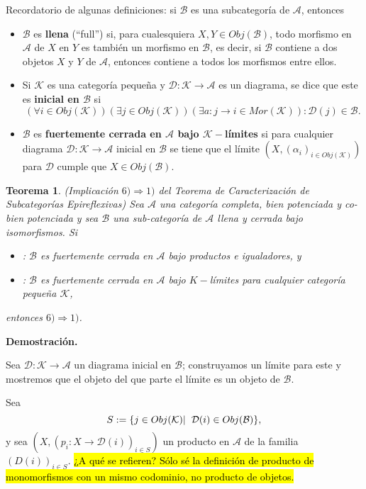 \documentclass[10pt]{article}
\newtheorem{teo}{Teorema}[section]
\begin{document}
Recordatorio de algunas definiciones: si $\mathcal{B}$ es una
subcategoría de $\mathcal{A}$, entonces
\begin{itemize}
	\item $\mathcal{B}$ es \textbf{llena} (``full'') si, para cualesquiera
	$X, Y \in Obj(\mathcal{B})$, todo morfismo en 
	$\mathcal{A}$ de $X$ en $Y$ es también un morfismo en 
	$\mathcal{B}$, es decir, si $\mathcal{B}$ contiene a dos objetos
	$X$ y $Y$ de $\mathcal{A}$, entonces contiene a todos los morfismos
	entre ellos.
	\item Si $\mathcal{K}$ es una categoría pequeña y 
	$\mathcal{D}: \mathcal{K} \longrightarrow \mathcal{A}$ es un diagrama,
	se dice que este es \textbf{inicial en $\mathcal{B}$} si
	\[
	(\forall i \in Obj(\mathcal{K}))
	(\exists j \in Obj(\mathcal{K}))
	(\exists a: j \longrightarrow i \in Mor(\mathcal{K})):
	\mathcal{D}(j) \in \mathcal{B}.
	\]
	\item $\mathcal{B}$ es \textbf{fuertemente cerrada en 
	$\mathcal{A}$ bajo $\mathcal{K}-$límites} si 
	para cualquier diagrama 
	$\mathcal{D}: \mathcal{K} \longrightarrow \mathcal{A}$	
	inicial en $\mathcal{B}$ se tiene que el límite 
	$(X, (\alpha_{i})_{i \in Obj(\mathcal{K})})$ para 
	$\mathcal{D}$ cumple que $X \in Obj(\mathcal{B})$.
\end{itemize}

\begin{teo}
(Implicación $6) \Rightarrow 1)$ del Teorema de Caracterización de
Subcategorías Epireflexivas) Sea $\mathcal{A}$ una categoría 
completa, bien potenciada y co-bien potenciada y sea 
$\mathcal{B}$ una sub-categoría de $\mathcal{A}$
llena y cerrada bajo isomorfismos. Si
\begin{itemize}
	\item[$6)$]: $\mathcal{B}$ es fuertemente cerrada en 
	$\mathcal{A}$ bajo productos e igualadores, y
	\item[$1)$]: $\mathcal{B}$ es fuertemente cerrada en $\mathcal{A}$
	bajo $K-$límites para cualquier categoría pequeña $\mathcal{K}$,
\end{itemize}
entonces $6) \Rightarrow 1)$.
\end{teo}
\noindent
\textbf{Demostración.}

Sea $\mathcal{D}: \mathcal{K} \longrightarrow \mathcal{A}$
un diagrama inicial en $\mathcal{B}$; construyamos un límite para 
este y mostremos que el objeto del que parte el límite es 
un objeto de $\mathcal{B}$.

Sea 
\[
S := \{ j \in Obj(\mathcal{K}) | \hspace{0.2cm} 
\mathcal{D}(i) \in Obj(\mathcal{B}) \},
\]
y sea $(X, (p_{i}: X \longrightarrow \mathcal{D}(i))_{i \in S})$
un producto en $\mathcal{A}$ de la familia $(D(i))_{i \in S}$.
\hl{¿A qué se refieren? Sólo sé la definición de producto de monomorfismos
con un mismo codominio, no producto de objetos.}
\end{document}
